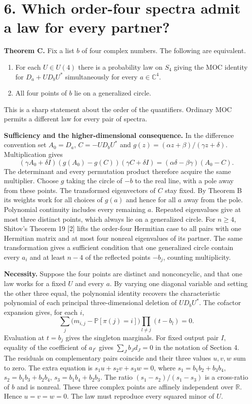 \documentclass[11pt]{article}
\newcommand{\heading}[1]{\section*{\color{ink}#1}}
\newcommand{\C}{\mathbb C}\newcommand{\R}{\mathbb R}\newcommand{\E}{\mathbb E}\newcommand{\pr}{\mathbb P}
\begin{document}
\newpage
\heading{6. Which order-four spectra admit a law for every partner?}
\textbf{Theorem C.} Fix a list $b$ of four complex numbers. The following are equivalent.
\begin{enumerate}
\item For each $U\in U(4)$ there is a probability law on $S_4$ giving the MOC identity for $D_a+U D_b U^*$ simultaneously for every $a\in\C^4$.
\item All four points of $b$ lie on a generalized circle.
\end{enumerate}
This is a sharp statement about the order of the quantifiers. Ordinary MOC permits a different law for every pair of spectra.
\par\textbf{Sufficiency and the higher-dimensional consequence.} In the difference convention set $A_0=D_a$, $C=-U D_b U^*$ and $g(z)=(\alpha z+\beta)/(\gamma z+\delta)$. Multiplication gives
\[
 (\gamma A_0+\delta I)(g(A_0)-g(C))(\gamma C+\delta I)=(\alpha\delta-\beta\gamma)(A_0-C).
\]
The determinant and every permutation product therefore acquire the same multiplier. Choose $g$ taking the circle of $-b$ to the real line, with a pole away from these points. The transformed eigenvectors of $C$ stay fixed. By Theorem B its weights work for all choices of $g(a)$ and hence for all $a$ away from the pole. Polynomial continuity includes every remaining $a$. Repeated eigenvalues give at most three distinct points, which always lie on a generalized circle. For $n\ge4$, Shitov's Theorem 19 [2] lifts the order-four Hermitian case to all pairs with one Hermitian matrix and at most four nonreal eigenvalues of its partner. The same transformation gives a sufficient condition that one generalized circle contain every $a_i$ and at least $n-4$ of the reflected points $-b_j$, counting multiplicity.
\par\textbf{Necessity.} Suppose the four points are distinct and nonconcyclic, and that one law works for a fixed $U$ and every $a$. By varying one diagonal variable and setting the other three equal, the polynomial identity recovers the characteristic polynomial of each principal three-dimensional deletion of $U D_b U^*$. The cofactor expansion gives, for each $i$,
\[
 \sum_j\big(m_{i,j}-\pr[\pi(j)=i]\big)\prod_{l\ne j}(t-b_l)=0.
\]
Evaluation at $t=b_j$ gives the singleton marginals. For fixed output pair $I$, equality of the coefficient of $a_{I^c}$ gives $\sum_J b_Jd_J=0$ in the notation of Section 4. The residuals on complementary pairs coincide and their three values $u,v,w$ sum to zero. The extra equation is $s_1u+s_2v+s_3w=0$, where $s_1=b_1b_2+b_3b_4$, $s_2=b_1b_3+b_2b_4$, $s_3=b_1b_4+b_2b_3$. The ratio $(s_1-s_2)/(s_1-s_3)$ is a cross-ratio of $b$ and is nonreal. These three complex points are affinely independent over $\R$. Hence $u=v=w=0$. The law must reproduce every squared minor of $U$.
\end{document}
